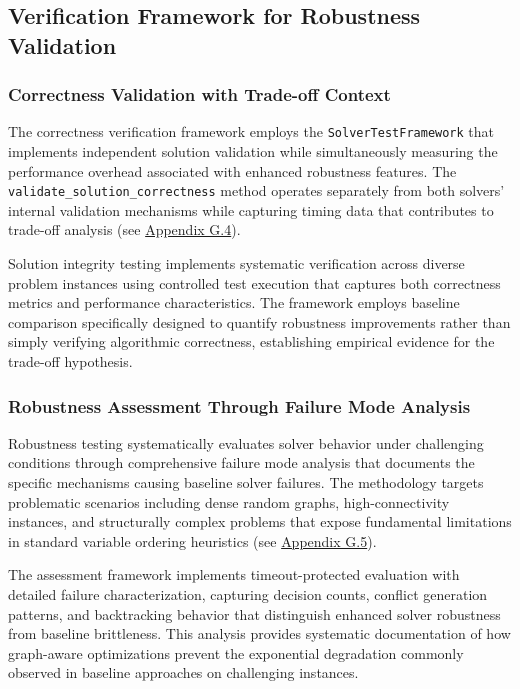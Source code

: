 \subsection{Verification Framework for Robustness Validation}
\label{sec:verification-framework}

\subsubsection{Correctness Validation with Trade-off Context}
\label{sec:correctness-validation}

The correctness verification framework employs the \texttt{SolverTestFramework} that implements independent solution validation while simultaneously measuring the performance overhead associated with enhanced robustness features. The \texttt{validate\_solution\_correctness} method operates separately from both solvers' internal validation mechanisms while capturing timing data that contributes to trade-off analysis (see \hyperref[appendix:correctness-validation]{Appendix G.4}).

Solution integrity testing implements systematic verification across diverse problem instances using controlled test execution that captures both correctness metrics and performance characteristics. The framework employs baseline comparison specifically designed to quantify robustness improvements rather than simply verifying algorithmic correctness, establishing empirical evidence for the trade-off hypothesis.

\subsubsection{Robustness Assessment Through Failure Mode Analysis}
\label{sec:robustness-assessment}

Robustness testing systematically evaluates solver behavior under challenging conditions through comprehensive failure mode analysis that documents the specific mechanisms causing baseline solver failures. The methodology targets problematic scenarios including dense random graphs, high-connectivity instances, and structurally complex problems that expose fundamental limitations in standard variable ordering heuristics (see \hyperref[appendix:failure-analysis]{Appendix G.5}).

The assessment framework implements timeout-protected evaluation with detailed failure characterization, capturing decision counts, conflict generation patterns, and backtracking behavior that distinguish enhanced solver robustness from baseline brittleness. This analysis provides systematic documentation of how graph-aware optimizations prevent the exponential degradation commonly observed in baseline approaches on challenging instances.

